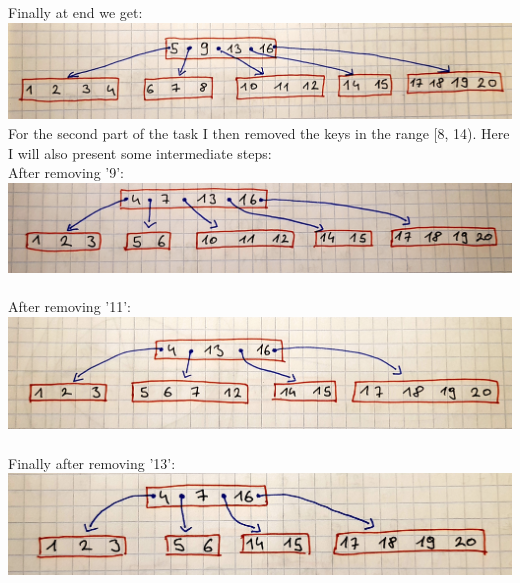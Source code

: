 \documentclass{article}
\begin{document}
\\ \\
Finally at end we get: \\ 
\includegraphics[scale = 0.1]{insfin}
\\ 

For the second part of the task I then removed the keys in the range [8, 14). Here I will also present some intermediate steps: \\
After removing '9': \\ 
\includegraphics[scale = 0.1]{rem9}
\\ \\
After removing '11': \\ 
\includegraphics[scale = 0.1]{rem11}
\\ \\
Finally after removing '13': \\ 
\includegraphics[scale = 0.1]{rem13}
\end{document}
